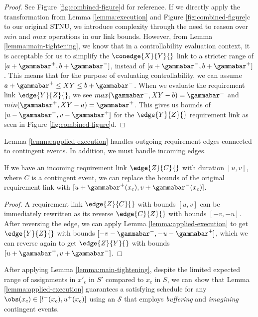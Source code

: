 \documentclass[11pt]{article}
\begin{document}
\begin{proof}
See Figure \ref{fig:combined-figure}d for reference. If we directly apply the transformation from
Lemma \ref{lemma:execution} and Figure \ref{fig:combined-figure}c to our original STNU, we introduce
complexity through the need to reason over \(min\) and \(max\) operations in our link bounds. However,
from Lemma \ref{lemma:main-tightening}, we know that in a controllability evaluation context, it is
acceptable for us to simplify the \(\conedge{X}{Y}{}\) link to a stricter range of \([a + \gammabar^+,
b + \gammabar^-]\), instead of \([a + \gammabar^-, b + \gammabar^+]\). This means that for the purpose
of evaluating controllability, we can assume \(a + \gammabar^+ \leq XY \leq b + \gammabar^-\). When we
evaluate the requirement link \(\edge{Y}{Z}{}\), we see \(max(\gammabar^-, XY - b) = \gammabar^-\) and
\(min(\gammabar^+, XY - a) = \gammabar^+\). This gives us bounds of \([u - \gammabar^-, v -
\gammabar^+]\) for the \(\edge{Y}{Z}{}\) requirement link as seen in Figure \ref{fig:combined-figure}d.
\end{proof}

Lemma \ref{lemma:applied-execution} handles outgoing requirement edges connected to contingent
events. In addition, we must handle incoming edges.

\begin{corollary}
\label{corollary:reversed}
If we have an incoming requirement link \(\edge{Z}{C}{}\) with duration \([u, v]\), where \(C\) is a
contingent event, we can replace the bounds of the original requirement link with \([u +
\gammabar^+(x_{c}), v + \gammabar^-(x_{c})]\).
\end{corollary}

\begin{proof}
A requirement link \(\edge{Z}{C}{}\) with bounds \([u, v]\) can be immediately rewritten as its reverse
\(\edge{C}{Z}{}\) with bounds \([-v, -u]\). After reversing the edge, we can apply Lemma
\ref{lemma:applied-execution} to get \(\edge{Y}{Z}{}\) with bounds \([-v - \gammabar^-, -u -
\gammabar^+]\), which we can reverse again to get \(\edge{Z}{Y}{}\) with bounds \([u + \gammabar^+, v +
\gammabar^-]\).
\end{proof}

After applying Lemma \ref{lemma:main-tightening}, despite the limited expected range of assignments in
\(x'_{c}\) in \(S'\) compared to \(x_{c}\) in \(S\), we can show that Lemma \ref{lemma:applied-execution}
guarantees a satisfying schedule for any \(\obs(x_{c}) \in [l^-(x_{c}), u^+(x_{c})]\) using an
\(\mathcal{S}\) that employs \emph{buffering} and \emph{imagining} contingent events.
\end{document}
